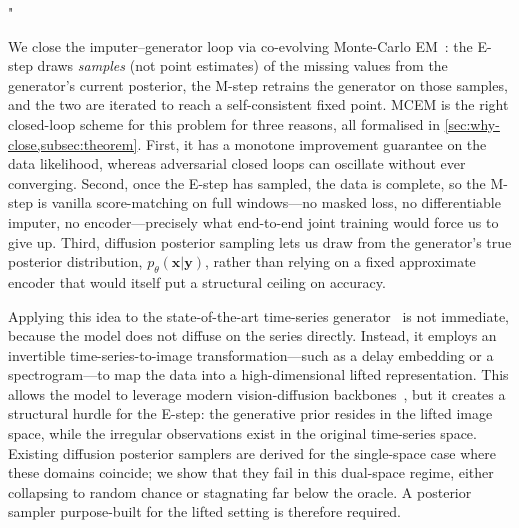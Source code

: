 "\documentclass{article}
\theoremstyle{plain}
\theoremstyle{definition}
\theoremstyle{remark}
\begin{document}
We close the imputer--generator loop via co-evolving Monte-Carlo EM~\citep{dempster1977em,wei1990mcem,neal1998em}: the E-step draws \emph{samples} (not point estimates) of the missing values from the generator's current posterior, the M-step retrains the generator on those samples, and the two are iterated to reach a self-consistent fixed point. MCEM is the right closed-loop scheme for this problem for three reasons, all formalised in \cref{sec:why-close,subsec:theorem}. First, it has a monotone improvement guarantee on the data likelihood, whereas adversarial closed loops can oscillate without ever converging. Second, once the E-step has sampled, the data is complete, so the M-step is vanilla score-matching on full windows---no masked loss, no differentiable imputer, no encoder---precisely what end-to-end joint training would force us to give up. Third, diffusion posterior sampling lets us draw from the generator's true posterior distribution, $p_\theta(\mathbf{x} | \mathbf{y})$, rather than relying on a fixed approximate encoder that would itself put a structural ceiling on accuracy.

Applying this idea to the state-of-the-art time-series generator~\citep{naiman2024imagentime} is not immediate, because the model does not diffuse on the series directly. Instead, it employs an invertible time-series-to-image transformation—such as a delay embedding or a spectrogram—to map the data into a high-dimensional lifted representation. This allows the model to leverage modern vision-diffusion backbones~\citep{karras2022edm}, but it creates a structural hurdle for the E-step: the generative prior resides in the lifted image space, while the irregular observations exist in the original time-series space. Existing diffusion posterior samplers are derived for the single-space case where these domains coincide; we show that they fail in this dual-space regime, either collapsing to random chance or stagnating far below the oracle. A posterior sampler purpose-built for the lifted setting is therefore required.
\end{document}

